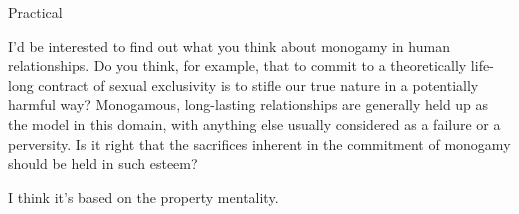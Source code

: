 \documentclass[11pt,oneside,openany,extrafontsizes]{memoir}
\begin{document}
\begin{emailexchange}{Practical}

    \begin{question}
        I'd be interested to find out what you think about monogamy in human relationships. Do you think, for example, that to commit to a theoretically life-long contract of sexual exclusivity is to stifle our true nature in a potentially harmful way? Monogamous, long-lasting relationships are generally held up as the model in this domain, with anything else usually considered as a failure or a perversity. Is it right that the sacrifices inherent in the commitment of monogamy should be held in such esteem?
    \end{question}

    \begin{answer}
        I think it's based on the property mentality.
    \end{answer}
\end{emailexchange}
\end{document}
